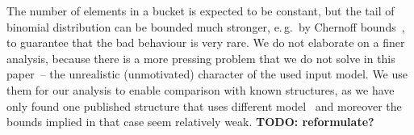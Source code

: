 The number of elements in a bucket is expected to be constant, but the tail of binomial distribution can be bounded much stronger, e.\,g.~by Chernoff bounds~\cite[chapter~4.1]{randomAlgs}, to guarantee that the bad behaviour is very rare.
We do not elaborate on a finer analysis, because there is a more pressing problem that we do not solve in this paper~-- the unrealistic (unmotivated) character of the used input model.
We use them for our analysis to enable comparison with known structures, as we have only found one published structure that uses different model~\cite{DemaineJP04} and moreover the bounds implied in that case seem relatively weak. {\bf TODO: reformulate?}


